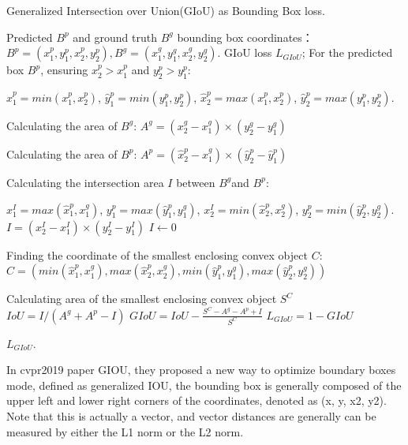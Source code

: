 \begin{algorithm}[htb]
  \caption{ Generalized Intersection over Union(GIoU) as Bounding Box loss.}
  \label{alg:Framwork}
  \begin{algorithmic}[1]
    \Require
    Predicted $B^{p}$ and ground truth $B^{g}$ bounding box coordinates：
     $ B^{p}=\left ( x_{1}^{p},y_{1}^{p},x_{2}^{p},y_{2}^{p} \right ),B^{g}=\left ( x_{1}^{g},y_{1}^{g},x_{2}^{g},y_{2}^{g} \right ).$
    \Ensure
     GIoU loss $L_{GIoU}$;
    \State For the predicted box $B^{p}$, ensuring $x_{2}^{p} > x_{1}^{p}$ and $y_{2}^{p} > y_{1}^{p}$:
    
    $\hat{x}_{1}^{p}=min( x_{1}^{p},x_{2}^{p})$, $\hat{y}_{1}^{p}=min( y_{1}^{p},y_{2}^{p})$,
    $\hat{x}_{2}^{p}=max( x_{1}^{p},x_{2}^{p})$, $\hat{y}_{2}^{p}=max( y_{1}^{p},y_{2}^{p})$.

    
    \State Calculating the area of $B^{g}$:
    $A^{g}=(x_{2}^{g}-x_{1}^{g}) \times (y_{2}^{g}-y_{1}^{g})$
   
    \State  Calculating the area of $B^{p}$:
    $A^{p}=(\hat{x}_{2}^{p}-\hat{x}_{1}^{g}) \times (\hat{y}_{2}^{p}-\hat{y}_{1}^{p})$
    
    \State Calculating the intersection area $I$ between  $B^{g}$and  $B^{p}$:
    
    $x_{1}^{I}=max( \hat{x}_{1}^{p},x_{1}^{g})$, $y_{1}^{p}=max( \hat{y}_{1}^{p},y_{1}^{g})$,
    $x_{2}^{I}=min(\hat{x}_{2}^{p},x_{2}^{g})$, $y_{2}^{p}=min(\hat{y}_{2}^{p},y_{2}^{g})$.
      \State  $I= (x_{2}^{I}-x_{1}^{I}) \times (y_{2}^{I}-y_{1}^{I})$ 
    \Else
      \State $I \gets 0$
      
    \EndIf
    \State Finding the coordinate of the smallest enclosing convex object $C$:
      $ C=\left ( min( \hat{x}_{1}^{p},x_{1}^{g}), max(\hat{x}_{2}^{p},x_{2}^{g}),
      min( \hat{y}_{1}^{p},y_{1}^{g}), max(\hat{y}_{2}^{p},y_{2}^{g}) \right )$
    
    \State Calculating area of the smallest enclosing convex object $S^{C}$
    \State $IoU=I/( A^{g} + A^{p} - I)$
    \State $GIoU=  IoU -\frac{S^{C}-A^{g} - A^{p} + I}{S^{C}}$
    \State $L_{GIoU}=1-GIoU$
    
    \Return $L_{GIoU}$.
  \end{algorithmic}
\end{algorithm}

In cvpr2019 paper GIOU, they proposed a new way to optimize boundary boxes mode, defined as generalized IOU, the bounding box is generally composed of the upper left and lower right corners of the coordinates, denoted as (x, y, x2, y2). Note that this is actually a vector, and vector distances are generally can be measured by either the L1 norm or the L2 norm.

